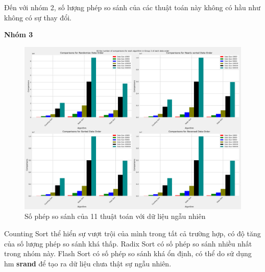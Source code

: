 Đến với nhóm 2, số lượng phép so sánh của các thuật toán này không có hầu như không có sự thay đổi. 



\textbf{Nhóm 3}

\begin{figure}[H]
    \centering
    \includegraphics[width=\textwidth]{exprimental_result/images/all_the_number_of_comparisons_for_each_algorithm_in_group_3_of_each_data_order.png}
    \caption{Số phép so sánh của 11 thuật toán với dữ liệu ngẫu nhiên}
    \label{fig:all_the_number_of_comparisons_for_each_algorithm_in_group_3_of_each_data_order}
\end{figure}

Counting Sort thể hiển sự vượt trội của mình trong tất cả trường hợp, có độ tăng của số lượng phép so sánh khá thấp. Radix Sort có số phép so sánh nhiều nhất trong nhóm này. Flash Sort có số phép so sánh khá ổn định, có thể do sử dụng hm \textbf{srand} để tạo ra dữ liệu chưa thật sự ngẫu nhiên.
